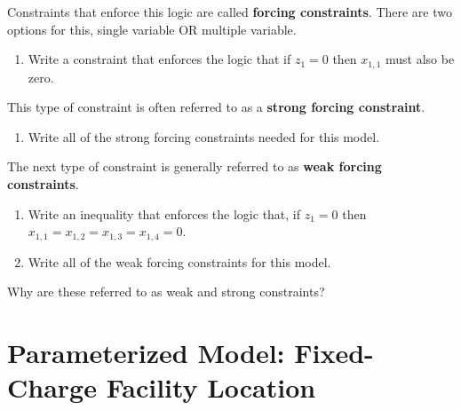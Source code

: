 \documentclass[11pt]{article}
\theoremstyle{definition}
\begin{document}
Constraints that enforce this logic are called \textbf{forcing constraints}. There are two options for this, single variable OR multiple variable.


\begin{enumerate}[resume]
\item Write a constraint that enforces the logic that if $z_1 = 0$ then $x_{1,1}$ must also be zero. \vspace{2in}
\end{enumerate}

This type of constraint is often referred to as a \textbf{strong forcing constraint}.

\begin{enumerate}[resume]
\item Write all of the strong forcing constraints needed for this model. \newpage
\end{enumerate}

The next type of constraint is generally referred to as \textbf{weak forcing constraints}.

\begin{enumerate}[resume]
\item Write an inequality that enforces the logic that, if $z_1 = 0$ then $x_{1,1} = x_{1,2} = x_{1,3} = x_{1,4} = 0$. \vspace{2in}
\item Write all of the weak forcing constraints for this model.
\end{enumerate}

\vfill

Why are these referred to as weak and strong constraints? \vspace{1in}


\newpage
\section{Parameterized Model: Fixed-Charge Facility Location}
\end{document}
